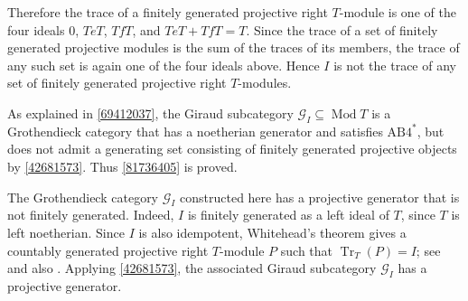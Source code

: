\documentclass[a4paper,10pt,reqno]{amsart}
\theoremstyle{definition}
\theoremstyle{plain}
\numberwithin{equation}{section}
\newcommand{\cG}{\mathcal{G}}
\DeclareMathOperator{\Mod}{Mod}
\DeclareMathOperator{\Tr}{Tr}
\newcommand{\ABfourst}{\mathrm{AB4}^{\ast}}
\begin{document}
Therefore the trace of a finitely generated projective right $T$-module is one of the four ideals $0$, $TeT$, $TfT$, and $TeT+TfT=T$. Since the trace of a set of finitely generated projective modules is the sum of the traces of its members, the trace of any such set is again one of the four ideals above. Hence $I$ is not the trace of any set of finitely generated projective right $T$-modules.

As explained in \cref{69412037}, the Giraud subcategory $\cG_{I}\subseteq\Mod T$ is a Grothendieck category that has a noetherian generator and satisfies $\ABfourst$, but does not admit a generating set consisting of finitely generated projective objects by \cref{42681573}. Thus \cref{81736405} is proved.

\begin{remark}\label{47160832}
The Grothendieck category $\cG_{I}$ constructed here has a projective generator that is not finitely generated. Indeed, $I$ is finitely generated as a left ideal of $T$, since $T$ is left noetherian. Since $I$ is also idempotent, Whitehead's theorem gives a countably generated projective right $T$-module $P$ such that $\Tr_{T}(P)=I$; see \cite[Corollary~2.7]{MR588450} and also \cite[Corollary~2.7]{MR3232793}. Applying \cref{42681573}, the associated Giraud subcategory $\cG_{I}$ has a projective generator.
\end{remark}



\end{document}
